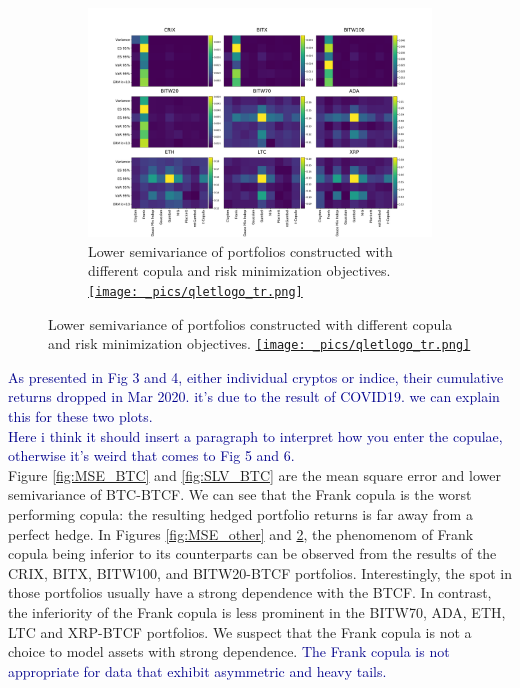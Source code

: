 \begin{figure}[!]
\begin{subfigure}{\textwidth}\centering
        \centering
        \includegraphics[width=\textwidth]{_pics/semiLowerVariance_other.pdf}
      \caption{Lower semivariance of portfolios constructed with different copula and risk minimization objectives.
      \href{http://www.quantlet.com/}{\texttt{[image: \_pics/qletlogo\_tr.png]}} }
    \label{fig:SLV_other}
\end{subfigure}
\end{figure}






\textcolor{darkblue}{As presented in Fig 3 and 4, either individual cryptos or indice, their cumulative returns dropped in Mar 2020. it's due to the result of COVID19. we can explain this for these two plots.}\\
\textcolor{darkblue}{Here i think it should insert a paragraph to interpret how you enter the copulae, otherwise it's weird that comes to Fig 5 and 6.}\\

Figure \ref{fig:MSE_BTC} and \ref{fig:SLV_BTC}  are the mean square
error and lower semivariance of BTC-BTCF. We can see that the Frank copula
is the worst performing copula: 
the resulting hedged portfolio returns is far away from a perfect
hedge. 
In Figures \ref{fig:MSE_other} and \ref{fig:SLV_other}, the phenomenom
of Frank copula being inferior to its counterparts can be observed
from the results of the CRIX, BITX, BITW100, and BITW20-BTCF
portfolios. 
Interestingly, the spot in those portfolios usually have a strong
dependence with the BTCF. 
In contrast, the inferiority of the Frank copula is less prominent in
the BITW70, ADA, ETH, LTC and XRP-BTCF portfolios. 
We suspect that the Frank copula is not a choice to model assets with
strong dependence. \textcolor{darkblue}{The Frank copula is not
  appropriate for data that exhibit asymmetric and heavy tails.}

